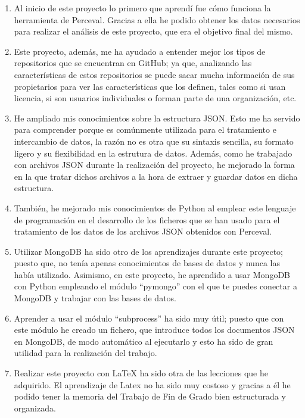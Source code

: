 \documentclass[a4paper, 12pt]{book}
\begin{document}
\begin{enumerate}
  \item  Al inicio de este proyecto lo primero que aprendí fue cómo funciona la herramienta de Perceval. Gracias a ella he podido obtener los datos necesarios para realizar el análisis de este proyecto, que era el objetivo final del mismo. 
  \item  Este proyecto, además, me ha ayudado a entender mejor los tipos de repositorios que se encuentran en GitHub; ya que, analizando las características de estos repositorios se puede sacar mucha información de sus propietarios para ver las características que los definen, tales como si usan licencia, si son usuarios individuales o forman parte de una organización, etc.
  \item  He ampliado mis conocimientos sobre la estructura JSON. Esto me ha servido para comprender porque es comúnmente utilizada para el tratamiento e intercambio de datos, la razón no es otra que su sintaxis sencilla, su formato ligero y su flexibilidad en la estrutura de datos. Además, como he trabajado con archivos JSON durante la realización del proyecto, he mejorado la forma en la que tratar dichos archivos a la hora de extraer y guardar datos en dicha estructura.  
  \item  También, he mejorado mis conocimientos de Python al emplear este lenguaje de programación en el desarrollo de los ficheros que se han usado para el tratamiento de los datos de los archivos JSON obtenidos con Perceval.    
  \item  Utilizar MongoDB ha sido otro de los aprendizajes durante este proyecto; puesto que, no tenía apenas conocimientos de bases de datos y nunca las había utilizado. Asimismo, en este proyecto, he aprendido a usar MongoDB con Python empleando el módulo ``pymongo'' con el que te puedes conectar a MongoDB y trabajar con las bases de datos.
  \item  Aprender a usar el módulo ``subprocess'' ha sido muy útil; puesto que con este módulo he creado un fichero, que introduce todos los documentos JSON en MongoDB, de modo automático al ejecutarlo y esto ha sido de gran utilidad para la realización del trabajo.
  \item  Realizar este proyecto con LaTeX ha sido otra de las lecciones que he adquirido. El aprendizaje de Latex no ha sido muy costoso y gracias a él he podido tener la memoria del Trabajo de Fin de Grado bien estructurada y organizada.
\end{enumerate}
\end{document}

